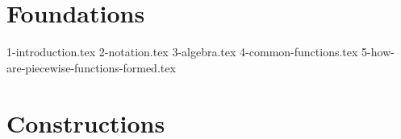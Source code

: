 \documentclass[10pt,a4paper]{article}
\begin{document}
\maketitle
\tableofcontents
\newpage

\part{Foundations}
{1-introduction.tex}
{2-notation.tex}
{3-algebra.tex}
{4-common-functions.tex}
{5-how-are-piecewise-functions-formed.tex}

\part{Constructions}
\end{document}
